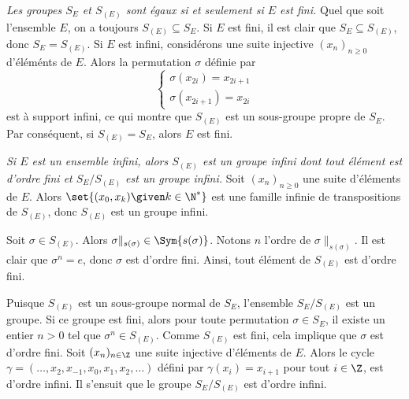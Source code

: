 \begin{enumerate}
    \emph{Les groupes $S_E$ et $S_{(E)}$ sont égaux si et seulement si $E$ est fini.}
    Quel que soit l'ensemble $E$, on a toujours $S_{(E)} \subseteq S_E$.
    Si $E$ est fini, il est clair que $S_E \subseteq S_{(E)}$, donc $S_E = S_{(E)}$.
    Si $E$ est infini, considérons une suite injective $(x_n)_{n\geq 0}$ d'éléménts de $E$.
    Alors la permutation $\sigma$ définie par
    \[
      \begin{cases}
        \sigma(x_{2i}) = x_{2i + 1} \\
        \sigma(x_{2i + 1}) = x_{2i}
      \end{cases}
    \]
    est à support infini, ce qui montre que $S_{(E)}$ est un sous-groupe propre de $S_E$.
    Par conséquent, si $S_{(E)} = S_E$, alors $E$ est fini.

    \emph{Si $E$ est un ensemble infini, alors $S_{(E)}$ est un groupe infini dont tout élément est d'ordre fini et $S_E/S_{(E)}$ est un groupe infini.}
    Soit $(x_n)_{n\geq 0}$ une suite d'éléments de $E$.
    Alors $\set{(x_0, x_k) \given k\in\N^*}$ est une famille infinie de transpositions de $S_{(E)}$, donc $S_{(E)}$ est un groupe infini.

    Soit $\sigma\in S_{(E)}$.
    Alors $\sigma\|_{s(\sigma)}\in\Sym{s(\sigma)}$.
    Notons $n$ l'ordre de $\sigma\|_{s(\sigma)}$.
    Il est clair que $\sigma^n = e$, donc $\sigma$ est d'ordre fini.
    Ainsi, tout élément de $S_{(E)}$ est d'ordre fini.

    Puisque $S_{(E)}$ est un sous-groupe normal de $S_E$, l'ensemble $S_E/S_{(E)}$ est un groupe.
    Si ce groupe est fini, alors pour toute permutation $\sigma\in S_E$, il existe un entier $n > 0$ tel que $\sigma^n\in S_{(E)}$.
    Comme $S_{(E)}$ est fini, cela implique que $\sigma$ est d'ordre fini.
    Soit $(x_n)_{n\in\Z}$ une suite injective d'éléments de $E$.
    Alors le cycle $\gamma = (\dots, x_2, x_{-1}, x_0, x_1, x_2, \dots)$ défini par $\gamma(x_i) = x_{i + 1}$ pour tout $i\in\Z$, est d'ordre infini.
    Il s'ensuit que le groupe $S_E/S_{(E)}$ est d'ordre infini.
\end{enumerate}

